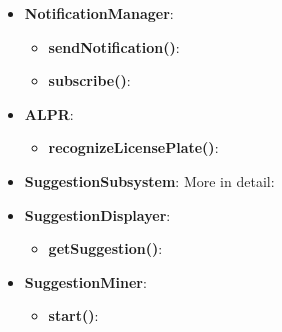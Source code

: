 \documentclass{article}
\begin{document}
\begin{itemize}
	\item \textbf{NotificationManager}:
		\begin{itemize}
			\item \textbf{sendNotification()}:
			\item \textbf{subscribe()}:
		\end{itemize}
	\item \textbf{ALPR}:
		\begin{itemize}
			\item \textbf{recognizeLicensePlate()}:
		\end{itemize}
	\item \textbf{SuggestionSubsystem}: More in detail:
	\item \textbf{SuggestionDisplayer}:
		\begin{itemize}
			\item \textbf{getSuggestion()}:
		\end{itemize}
	\item \textbf{SuggestionMiner}:
		\begin{itemize}
			\item \textbf{start()}:
		\end{itemize}
\end{itemize}
\end{document}
